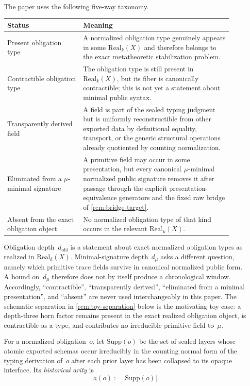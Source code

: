\documentclass{lmcs}
\newcommand{\Real}{\mathrm{Real}}
\newcommand{\Supp}{\mathrm{Supp}}
\begin{document}
\begin{rem}
\label{rem:present-vs-cost}
The paper uses the following five-way taxonomy.
\begin{center}
\small
\begin{tabular}{@{}p{0.31\linewidth}p{0.61\linewidth}@{}}
\toprule
Status & Meaning \\
\midrule
Present obligation type & A normalized obligation type genuinely appears in some $\Real_k(X)$ and therefore belongs to the exact metatheoretic stabilization problem. \\
Contractible obligation type & The obligation type is still present in $\Real_k(X)$, but its fiber is canonically contractible; this is not yet a statement about minimal public syntax. \\
Transparently derived field & A field is part of the sealed typing judgment but is uniformly reconstructible from other exported data by definitional equality, transport, or the generic structural operations already quotiented by counting normalization. \\
Eliminated from a $\mu$-minimal signature & A primitive field may occur in some presentation, but every canonical $\mu$-minimal normalized public signature removes it after passage through the explicit presentation-equivalence generators and the fixed raw bridge of \autoref{rem:bridge-target}. \\
Absent from the exact obligation object & No normalized obligation type of that kind occurs in the relevant $\Real_k(X)$. \\
\bottomrule
\end{tabular}
\end{center}
Obligation depth~$d_{\mathrm{obl}}$ is a statement about exact normalized obligation types as realized in $\Real_k(X)$. Minimal-signature depth~$d_\mu$ asks a different question, namely which primitive trace fields survive in canonical normalized public form. A bound on~$d_\mu$ therefore does not by itself produce a chronological window. Accordingly, ``contractible'', ``transparently derived'', ``eliminated from a minimal presentation'', and ``absent'' are never used interchangeably in this paper. The schematic separation in \autoref{rem:toy-separation} below is the motivating toy case: a depth-three horn factor remains present in the exact realized obligation object, is contractible as a type, and contributes no irreducible primitive field to~$\mu$.
\end{rem}

\begin{defi}
\label{def:arity}
For a normalized obligation~$o$, let $\Supp(o)$ be the set of sealed layers whose atomic exported schemas occur irreducibly in the counting normal form of the typing derivation of~$o$ after each prior layer has been collapsed to its opaque interface. Its \emph{historical arity} is
\[
  a(o) := |\Supp(o)|.
\]
\end{defi}
\end{document}
